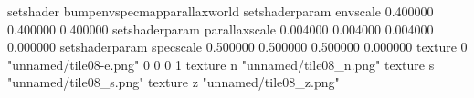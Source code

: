 setshader bumpenvspecmapparallaxworld
setshaderparam envscale 0.400000 0.400000 0.400000
setshaderparam parallaxscale 0.004000 0.004000 0.004000 0.000000
setshaderparam specscale 0.500000 0.500000 0.500000 0.000000
texture 0 "unnamed/tile08-e.png" 0 0 0 1
texture n "unnamed/tile08_n.png"
texture s "unnamed/tile08_s.png"
texture z "unnamed/tile08_z.png"